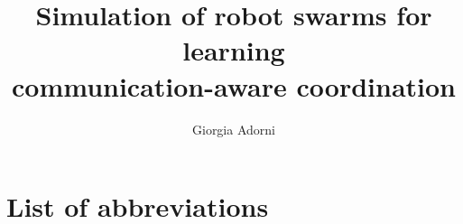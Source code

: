 \documentclass[mscthesis, 11pt]{usiinfthesis}
\title{Simulation of robot swarms for learning\\ communication-aware coordination} %
\author{Giorgia Adorni} %
\begin{document}
\maketitle %

\frontmatter %

\begin{abstract}
\begingroup
\let\clearpage\relax

\endgroup
\end{abstract}


\begin{acknowledgements}
\begingroup
\let\clearpage\relax

\endgroup
\end{acknowledgements}

\tableofcontents 
\listoffigures %
\listoftables %


\mainmatter










\appendix%
	
\chapter{List of abbreviations}
\label{chp:abbreviations}
\begingroup
\let\clearpage\relax
\glsaddall  %
\vspace*{-120pt}
\printglossary[type=acronym]
\endgroup


\backmatter

%
%
\nocite{*}



\end{document}
